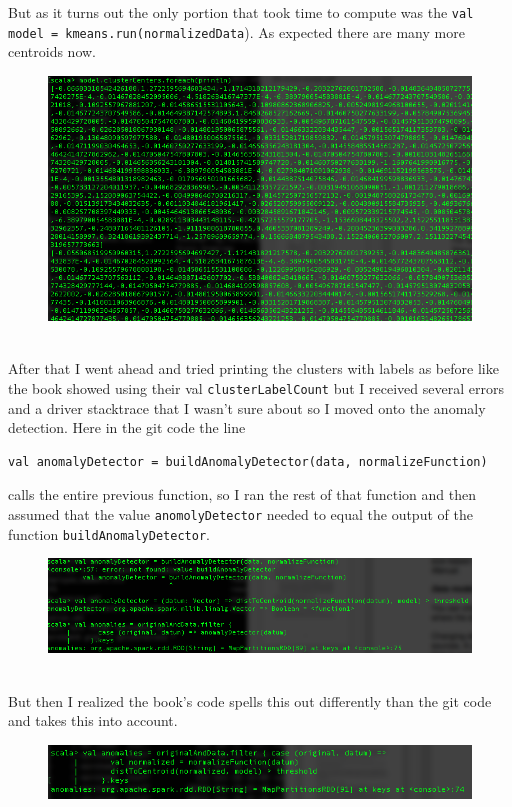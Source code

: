 \documentclass[10pt]{article}
\begin{document}
\indent But as it turns out the only portion that took time to compute was the \verb|val model = kmeans.run(normalizedData|). As expected there are many more centroids now.
\begin{figure}[!h]
\includegraphics[scale=0.37]{newCentroids.png}
\centering
\end{figure}\\
\indent After that I went ahead and tried printing the clusters with labels as before like the book showed using their val \verb|clusterLabelCount| but I received several errors and a driver stacktrace that I wasn't sure about so I moved onto the anomaly detection. Here in the git code the line 
\begin{verbatim}
val anomalyDetector = buildAnomalyDetector(data, normalizeFunction)
\end{verbatim}
calls the entire previous function, so I ran the rest of that function and then assumed that the value \verb|anomolyDetector| needed to equal the output of the function \verb|buildAnomalyDetector|.
\begin{figure}[!h]
\includegraphics[scale=0.37]{functionOutput.png}
\centering
\end{figure}\\
\indent But then I realized the book's code spells this out differently than the git code and takes this into account. 
\pagebreak
\begin{figure}[!h]
\includegraphics[scale=0.37]{bookFunction.png}
\centering
\end{figure}\\
\end{document}
